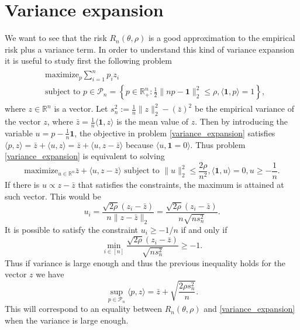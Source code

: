 \section{Variance expansion}
We want to see that the risk $R_n(\theta, \rho)$ is a good approximation to the empirical risk plus a variance term. In order to understand this kind of variance expansion it is useful to study first the following problem
\begin{align}\label{variance_expansion}
	\begin{aligned}
         &\text{maximize}_{p} \sum_{i=1}^n p_i z_i \\
         &\text{subject to } p \in \mathcal{P}_n = \left\{p\in \mathbb{R}_+^n : \frac{1}{2} \|np-\textbf{1}\|_2^2 \leq \rho, \langle \textbf{1}, p \rangle = 1\right\},
	\end{aligned}
\end{align}
where $z \in \mathbb{R}^n$ is a vector. Let $s_n^2 := \frac{1}{n} \|z\|_2^2 - (\bar{z})^2 $ be the empirical variance of the vector $z$, where $\bar{z} = \frac{1}{n} \langle \textbf{1}, z\rangle$ is the mean value of $z$. Then by introducing the variable $u=p-\frac{1}{n} \textbf{1}$, the objective in problem \eqref{variance_expansion} satisfies $\langle p, z \rangle = \bar{z} + \langle u, z \rangle = \bar{z} + \langle u, z-\bar{z} \rangle$ because $\langle u, \textbf{1}=0\rangle$. Thus problem \eqref{variance_expansion} is equivalent to solving
\[
    \text{maximize}_{u\in \mathbb{R}^n}  \bar{z} + \langle  u, z-\bar{z}\rangle \text{  subject to } \|u\|_2^2 \leq \frac{2\rho}{n^2}, \langle \textbf{1}, u\rangle = 0, u \geq -\frac{1}{n}.
\]
If there is $u \propto z-\bar{z}$ that satisfies the constraints, the maximum is attained at such vector. This would be 
\[
    u_i = \frac{\sqrt{2\rho}(z_i -\bar{z})}{n\|z-\bar{z}\|_2} = \frac{\sqrt{2\rho} (z_i -\bar{z})}{n\sqrt{ns^2_n}}.
\]
It is possible to satisfy the constraint $u_i \geq -1/n$  if and only if 
\[
    \min_{i\in [n]} \frac{\sqrt{2\rho}(z_i - \bar{z})}{\sqrt{ns_n^2}} \geq -1.
\]
Thus if variance is large enough and thus the previous inequality holds for the vector $z$ we have 
\[
    \sup_{p\in\mathcal{P}_n} \langle p, z\rangle = \bar{z} + \sqrt{\frac{2\rho s_n^2}{n}}.
\]
This will correspond to an equality between $R_n(\theta, \rho)$ and \eqref{variance_expansion} when the variance is large enough.
